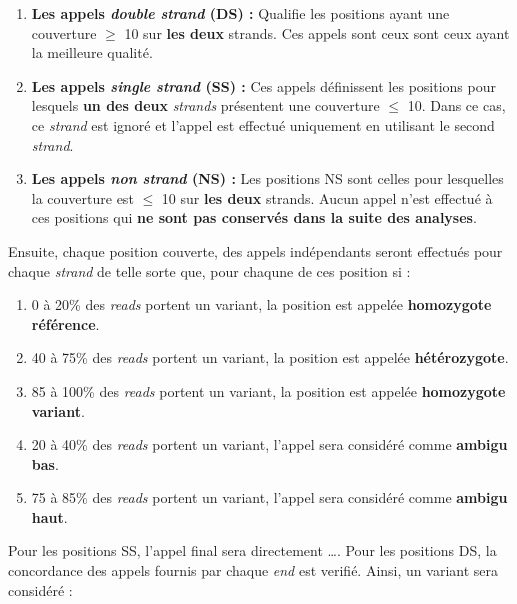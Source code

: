 \documentclass[12pt,twoside]{reedthesis}
\providecommand{\tightlist}{%
  \setlength{\itemsep}{0pt}\setlength{\parskip}{0pt}}
\theoremstyle{definition}
\theoremstyle{definition}
\theoremstyle{remark}
\begin{document}
  \begin{enumerate}
  \def\labelenumi{\arabic{enumi}.}
  \tightlist
  \item
    \textbf{Les appels \emph{double strand} (DS) :} Qualifie les positions
    ayant une couverture \(\ge\) 10 sur \textbf{les deux} strands. Ces
    appels sont ceux sont ceux ayant la meilleure qualité.\\
  \item
    \textbf{Les appels \emph{single strand} (SS) :} Ces appels définissent
    les positions pour lesquels \textbf{un des deux} \emph{strands}
    présentent une couverture \(\le\) 10. Dans ce cas, ce \emph{strand}
    est ignoré et l'appel est effectué uniquement en utilisant le second
    \emph{strand}.\\
  \item
    \textbf{Les appels \emph{non strand} (NS) :} Les positions NS sont
    celles pour lesquelles la couverture est \(\le\) 10 sur \textbf{les
    deux} strands. Aucun appel n'est effectué à ces positions qui
    \textbf{ne sont pas conservés dans la suite des analyses}.
  \end{enumerate}
  
  Ensuite, chaque position couverte, des appels indépendants seront
  effectués pour chaque \emph{strand} de telle sorte que, pour chaqune de
  ces position si :
  
  \begin{enumerate}
  \def\labelenumi{\arabic{enumi}.}
  \tightlist
  \item
    0 à 20\% des \emph{reads} portent un variant, la position est appelée
    \textbf{homozygote référence}.\\
  \item
    40 à 75\% des \emph{reads} portent un variant, la position est appelée
    \textbf{hétérozygote}.\\
  \item
    85 à 100\% des \emph{reads} portent un variant, la position est
    appelée \textbf{homozygote variant}.\\
  \item
    20 à 40\% des \emph{reads} portent un variant, l'appel sera considéré
    comme \textbf{ambigu bas}.\\
  \item
    75 à 85\% des \emph{reads} portent un variant, l'appel sera considéré
    comme \textbf{ambigu haut}.
  \end{enumerate}
  
  Pour les positions SS, l'appel final sera directement \ldots{}. Pour les
  positions DS, la concordance des appels fournis par chaque \emph{end}
  est verifié. Ainsi, un variant sera considéré :
  
\end{document}
